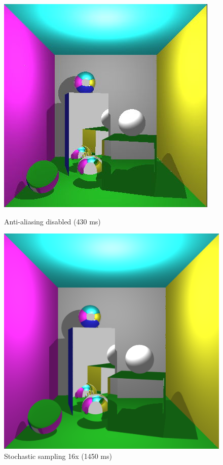 \begin{figure}[H]
\centering
{}
    \centering
    \includegraphics[width=\linewidth]{img/glass_refraction.jpg}
    \caption{Anti-aliasing disabled (430 ms)}
\endminipage
{}
    \centering
    \includegraphics[width=\linewidth]{img/antialiasing/stoAA16x_full.png}
    \caption{Stochastic sampling 16x (1450 ms)}
\endminipage
\end{figure}


